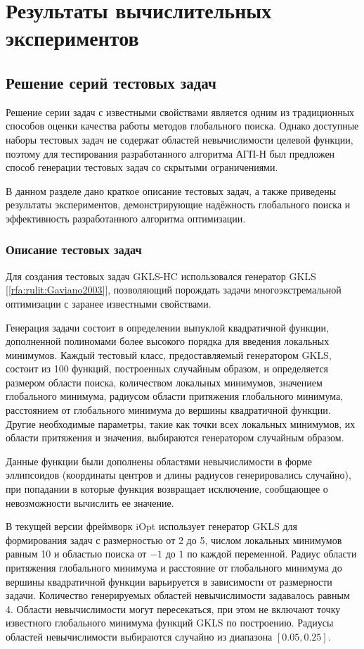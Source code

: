 \documentclass[a4paper,12pt,russian]{article}
\begin{document}
\section{Результаты вычислительных экспериментов}

\subsection{Решение серий тестовых задач} \label{GKLS_HC}

Решение серии задач с известными свойствами является одним из традиционных способов оценки качества работы методов глобального поиска. 
Однако доступные наборы тестовых задач не содержат областей невычислимости целевой функции, поэтому для тестирования разработанного алгоритма АГП-Н был предложен способ генерации тестовых задач со скрытыми ограничениями.

В данном разделе дано краткое описание тестовых задач, а также приведены результаты экспериментов, демонстрирующие надёжность глобального поиска и эффективность разработанного алгоритма оптимизации.

\subsubsection{Описание тестовых задач} \label{GKLS_HC}
 
Для создания тестовых задач GKLS-HC использовался генератор GKLS [\ref{rfa:rulit:Gaviano2003}], позволяющий порождать задачи многоэкстремальной оптимизации с заранее известными свойствами. 

Генерация задачи состоит в определении выпуклой квадратичной функции, дополненной полиномами более высокого порядка для введения локальных минимумов. Каждый тестовый класс, предоставляемый генератором GKLS, состоит из 100 функций, построенных случайным образом, и определяется размером области поиска, количеством локальных минимумов, значением глобального минимума, радиусом области притяжения глобального минимума, расстоянием от глобального минимума до вершины квадратичной функции. Другие необходимые параметры, такие как точки всех локальных минимумов, их области притяжения и значения, выбираются генератором случайным образом.

Данные функции были дополнены областями невычислимости в форме эллипсоидов (координаты центров и длины радиусов генерировались случайно), при попадании в которые функция возвращает исключение, сообщающее о невозможности вычислить ее значение.

В текущей версии фреймворк iOpt использует генератор GKLS для формирования задач с размерностью от 2 до 5, числом локальных минимумов равным 10 и областью поиска от $-1$ до $1$ по каждой переменной. Радиус области притяжения глобального минимума и расстояние от глобального минимума до вершины квадратичной функции варьируется в зависимости от размерности задачи. Количество генерируемых областей невычислимости задавалось равным 4. Области невычислимости могут пересекаться, при этом не включают точку известного глобального минимума функций GKLS по построению. Радиусы областей невычислимости выбираются случайно из диапазона $[0.05, 0.25]$.
\end{document}
